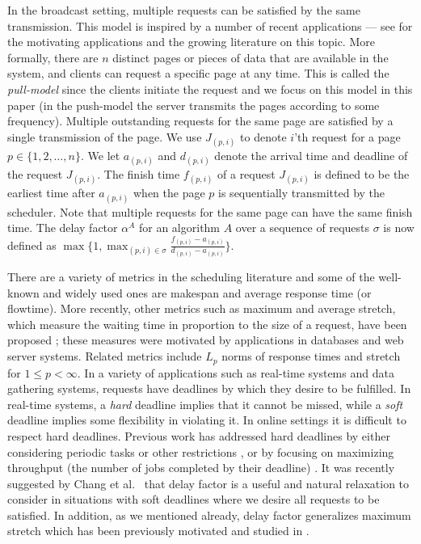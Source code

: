 \documentclass[11pt]{article}
\newcommand{\etal}{et al.\ }
\begin{document}
In the broadcast setting, multiple requests can be satisfied by the
same transmission. This model is inspired by a number of recent
applications --- see \cite{BarnoyBNS98, AksoyF98, AcharyaFZ95,
  BartalM00} for the motivating applications and the growing
literature on this topic. More formally, there are $n$ distinct pages
or pieces of data that are available in the system, and clients can
request a specific page at any time. This is called the {\em
  pull-model} since the clients initiate the request and we focus on
this model in this paper (in the push-model the server transmits the
pages according to some frequency). Multiple outstanding requests for
the same page are satisfied by a single transmission of the page. We
use $J_{(p,i)}$ to denote $i$'th request for a page $p \in \{1, 2,
\ldots, n\}$. We let $a_{(p,i)}$ and $d_{(p,i)}$ denote the arrival
time and deadline of the request $J_{(p,i)}$. The finish time
$f_{(p,i)}$ of a request $J_{(p,i)}$ is defined to be the earliest time after
$a_{(p,i)}$ when the page $p$ is sequentially transmitted by the
scheduler. Note that multiple requests for the same page can have the
same finish time. The delay factor $\alpha^A$ for an algorithm $A$ over
a sequence of requests $\sigma$ is now defined as $ \max\{1, \max_{(p,i) \in
  \sigma}\frac{f_{(p,i)} - a_{(p,i)}}{d_{(p,i)} - a_{(p,i)}}\}$.

\medskip
{} There are a variety of metrics in the
scheduling literature and some of the well-known and widely used ones
are makespan and average response time (or flowtime). More recently,
other metrics such as maximum and average stretch, which measure the
waiting time in proportion to the size of a request, have been
proposed \cite{BenderCM98, Karger99, Sgall98}; these measures were
motivated by applications in databases and web server systems. Related
metrics include $L_p$ norms of response times and stretch
\cite{BansalP03, AvrahamiA03, ChekuriGKK04} for $1 \le p < \infty$. In
a variety of applications such as real-time systems and data gathering
systems, requests have deadlines by which they desire to be
fulfilled. In real-time systems, a {\em hard} deadline implies that it
cannot be missed, while a {\em soft} deadline implies some flexibility
in violating it. In online settings it is difficult to respect hard
deadlines. Previous work has addressed hard deadlines by either
considering periodic tasks or other restrictions \cite{Burnsb08}, or
by focusing on maximizing throughput (the number of jobs completed by
their deadline) \cite{Kimc04, ChanLTW04, ZhengFCCPW06}. It was
recently suggested by Chang \etal \cite{ChangEGK08} that delay factor
is a useful and natural relaxation to consider in situations with soft
deadlines where we desire all requests to be satisfied. In addition,
as we mentioned already, delay factor generalizes maximum stretch
which has been previously motivated and studied in
\cite{BenderCM98,BenderMR02}.
\end{document}
